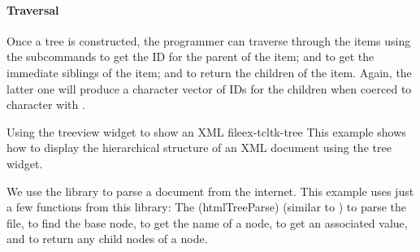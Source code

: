 
\paragraph{Traversal}
Once a tree is constructed, the programmer can traverse
through the items using the subcommands
 to get the ID for the parent of the
item;  and
 to get the immediate siblings of the
item; and  to return the children of
the item. Again, the latter one will produce a character vector of  IDs for the
children when coerced to character with .



\begin{example}{Using the treeview widget to show an XML file}{ex-tcltk-tree}
This example shows how to display the hierarchical structure of an XML
document using the tree widget.

We use the  library to parse a document from the
internet. This example uses just a few functions from this library:
The \function(htmlTreeParse) (similar to ) to parse the file, 
 to find the base node,
 to get the name of a node, 
 to get an associated value, and
 to return any child nodes of a node.




\end{example}
